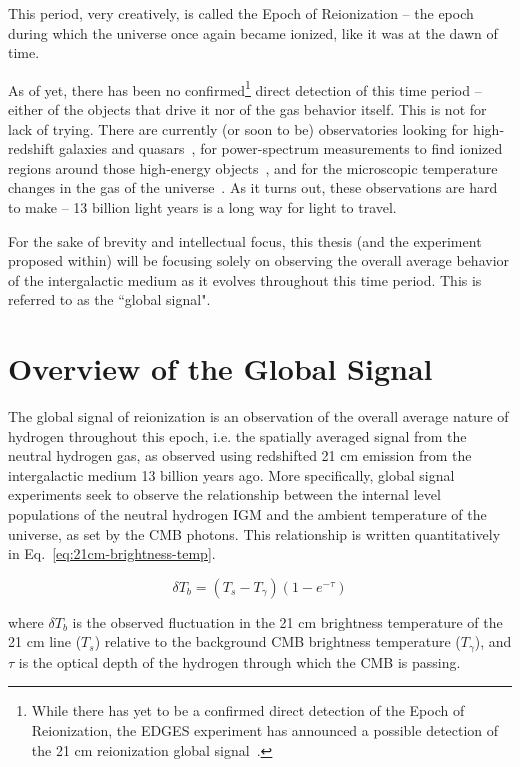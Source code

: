 This period, very creatively, is called the Epoch of Reionization -- the epoch 
during which the universe once again became ionized, like it was at the dawn of 
time.

As of yet, there has been no confirmed\footnote{While there has yet to be a 
confirmed direct detection of the Epoch of Reionization, the EDGES experiment 
has announced a possible detection of the 21 cm reionization global 
signal~\citep{bowman2018}.} direct detection of this time period -- either of 
the objects that drive it nor of the gas behavior itself.  This is not for lack 
of trying.  There are currently (or soon to be) observatories looking for 
high-redshift galaxies and quasars~\citep{gardner2006}, for power-spectrum 
measurements to find ionized regions around those high-energy 
objects~\citep{deboer2017}, and for the microscopic temperature changes in the 
gas of the universe~\citep{bowman2010}.  As it turns out, these observations 
are hard to make -- 13 billion light years is a long way for light to travel.

For the sake of brevity and intellectual focus, this thesis (and the experiment 
proposed within) will be focusing solely on observing the overall average 
behavior of the intergalactic medium as it evolves throughout this time period.  
This is referred to as the ``global signal".

\section{Overview of the Global Signal}

The global signal of reionization is an observation of the overall average 
nature of hydrogen throughout this epoch, i.e. the spatially averaged signal 
from the neutral hydrogen gas, as observed using redshifted 21 cm emission from 
the intergalactic medium 13 billion years ago. More specifically, global signal 
experiments seek to observe the relationship between the internal level 
populations of the neutral hydrogen IGM and the ambient temperature of the 
universe, as set by the CMB photons.  This relationship is written 
quantitatively in Eq.~\eqref{eq:21cm-brightness-temp}.

\begin{equation}
    \delta T_b = (T_s - T_\gamma)(1 - e^{-\tau})
    \label{eq:21cm-brightness-temp}
\end{equation}

\noindent where $\delta T_b$ is the observed fluctuation in the 21 cm 
brightness temperature of the 21 cm line ($T_s$) relative to the background CMB 
brightness temperature ($T_\gamma$), and $\tau$ is the optical depth of the 
hydrogen through which the CMB is passing.

